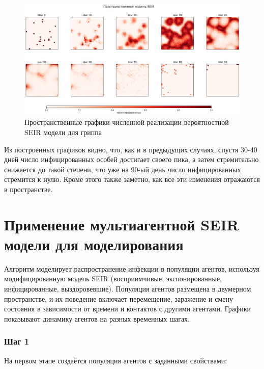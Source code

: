 \documentclass[a4paper, 14pt]{extreport}
\numberwithin{equation}{section}
\begin{document}
	\begin{figure}[h]
		\centering
		\includegraphics[scale=0.4]{images/graph03}
		\caption{Пространственные графики численной реализации вероятностной SEIR модели для гриппа}
		\label{fig:graph03}
	\end{figure}
	
	Из построенных графиков видно, что, как и в предыдущих случаях, спустя 30-40 дней число инфицированных особей достигает своего пика, а затем стремительно снижается до такой степени, что уже на 90-ый день число инфицированных стремится к нулю. Кроме этого также заметно, как все эти изменения отражаются в пространстве.
	
	\section{Применение мультиагентной SEIR модели для моделирования}
	Алгоритм моделирует распространение инфекции в популяции агентов, используя модифицированную модель SEIR (восприимчивые, экспонированные, инфицированные, выздоровевшие). Популяция агентов размещена в двумерном пространстве, и их поведение включает перемещение, заражение и смену состояния в зависимости от времени и контактов с другими агентами. Графики показывают динамику агентов на разных временных шагах.
	
	\subsubsection*{Шаг 1}
	
	На первом этапе создаётся популяция агентов с заданными свойствами:
	
\end{document}
